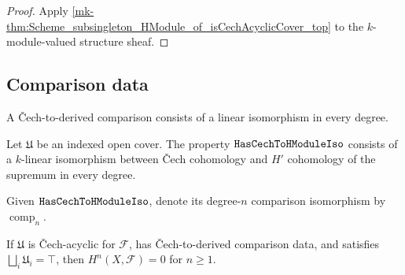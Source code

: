 \begin{proof}
  \leanok


Apply \ref{mk-thm:Scheme_subsingleton_HModule_of_isCechAcyclicCover_top} to the \(k\)-module-valued structure sheaf.
\end{proof}

\subsection{Comparison data}

A \v{C}ech-to-derived comparison consists of a linear isomorphism in every degree.

\begin{definition}\label{mk-def:Scheme_HasCechToHModuleIso}
  \leanok


  Let \(\mathfrak U\) be an indexed open cover. The property \(\mathtt{HasCechToHModuleIso}\) consists of a \(k\)-linear isomorphism between \v{C}ech cohomology and \(H'\) cohomology of the supremum in every degree.
\end{definition}

\begin{definition}\label{mk-def:Scheme_cechToHModuleIso}
  \leanok


  Given \(\mathtt{HasCechToHModuleIso}\), denote its degree-\(n\) comparison isomorphism by \(\operatorname{comp}_n\).
\end{definition}

\begin{theorem}\label{mk-thm:Scheme_subsingleton_HModule_of_hasCechToHModuleIso_top}
  \leanok


  If \(\mathfrak U\) is \v{C}ech-acyclic for \(\mathcal F\), has \v{C}ech-to-derived comparison data, and satisfies \(\bigsqcup_i\mathfrak U_i=\top\), then \(H^n(X,\mathcal F)=0\) for \(n\geq1\).
\end{theorem}

